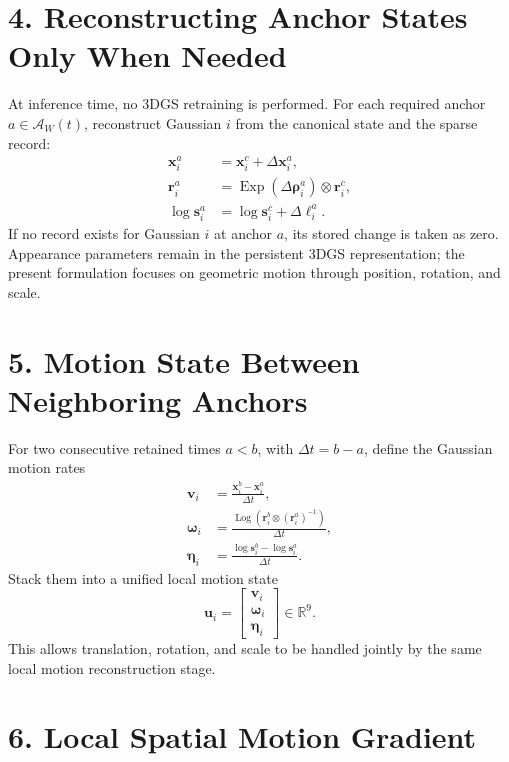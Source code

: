 \documentclass[10pt]{article}
\newcommand{\Win}{\mathcal{A}_{W}(t)}
\newcommand{\R}{\mathbb{R}}
\begin{document}
\section*{4. Reconstructing Anchor States Only When Needed}

At inference time, no 3DGS retraining is performed. For each required anchor $a\in\Win$, reconstruct Gaussian $i$ from the canonical state and the sparse record:
\begin{align}
\mathbf{x}_i^a &= \mathbf{x}_i^c+\Delta\mathbf{x}_i^a,\\
\mathbf{r}_i^a &= \operatorname{Exp}(\Delta\boldsymbol{\rho}_i^a)\otimes\mathbf{r}_i^c,\\
\log\mathbf{s}_i^a &= \log\mathbf{s}_i^c+\Delta\boldsymbol{\ell}_i^a.
\end{align}
If no record exists for Gaussian $i$ at anchor $a$, its stored change is taken as zero. Appearance parameters remain in the persistent 3DGS representation; the present formulation focuses on geometric motion through position, rotation, and scale.

\section*{5. Motion State Between Neighboring Anchors}

For two consecutive retained times $a<b$, with $\Delta t=b-a$, define the Gaussian motion rates
\begin{align}
\mathbf{v}_i &= \frac{\mathbf{x}_i^b-\mathbf{x}_i^a}{\Delta t},\\
\boldsymbol{\omega}_i
&= \frac{\operatorname{Log}\!\left(\mathbf{r}_i^b\otimes(\mathbf{r}_i^a)^{-1}\right)}{\Delta t},\\
\boldsymbol{\eta}_i
&= \frac{\log\mathbf{s}_i^b-\log\mathbf{s}_i^a}{\Delta t}.
\end{align}
Stack them into a unified local motion state
\[
\mathbf{u}_i=
\begin{bmatrix}
\mathbf{v}_i\\
\boldsymbol{\omega}_i\\
\boldsymbol{\eta}_i
\end{bmatrix}
\in\R^9.
\]
This allows translation, rotation, and scale to be handled jointly by the same local motion reconstruction stage.

\section*{6. Local Spatial Motion Gradient}
\end{document}
